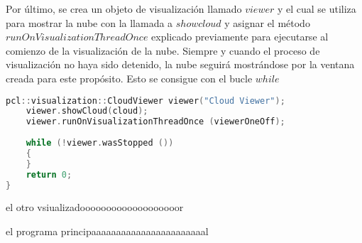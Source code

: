 Por último, se crea un objeto de visualización llamado $viewer$ y el cual se utiliza para mostrar la nube con la llamada a $showcloud$ y asignar el método $runOnVisualizationThreadOnce$ explicado previamente para ejecutarse al comienzo de la visualización de la nube. 
Siempre y cuando el proceso de visualización no haya sido detenido, la nube seguirá mostrándose por la ventana creada para este propósito. Esto se consigue con el bucle $while$

\begin{lstlisting}[language=C++,breaklines]
	pcl::visualization::CloudViewer viewer("Cloud Viewer");
    viewer.showCloud(cloud);
    viewer.runOnVisualizationThreadOnce (viewerOneOff);
    
    while (!viewer.wasStopped ())
    {
    }
    return 0;
}
\end{lstlisting}

el otro vsiualizadooooooooooooooooooor

el programa principaaaaaaaaaaaaaaaaaaaaaaal

